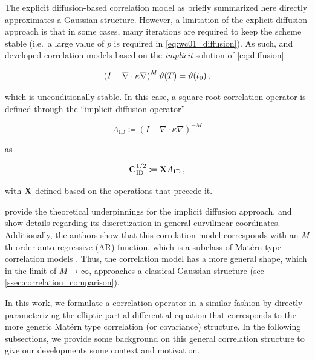 The explicit diffusion-based correlation model as briefly summarized here
directly approximates a Gaussian structure.
However, a limitation of the explicit diffusion approach is that in some cases, many
iterations are required to keep the scheme stable (i.e.\ a large value of $p$ is
required in \cref{eq:wc01_diffusion}).
As such, \citet{mirouze_representation_2010} and
\citet{carrier_background-error_2010} developed correlation models based on the
\textit{implicit} solution of \cref{eq:diffusion}:
\begin{linenomath*}\begin{equation}
    \left( I - \nabla\cdot\kappa\nabla\right)^M\vartheta(T) = \vartheta(t_0) \, ,
    \label{eq:implicit_diffusion}
\end{equation}\end{linenomath*}
which is unconditionally stable.
In this case, a square-root correlation operator is defined through the
``implicit diffusion operator''
\begin{linenomath*}\begin{equation}
A_\text{ID} \coloneqq \left(I - \nabla \cdot \kappa\nabla\right)^{-M}
\end{equation}\end{linenomath*}
as
\begin{linenomath*}\begin{equation}
    \mathbf{C}^{1/2}_\text{ID} \coloneqq \mathbf{X} A_\text{ID} \, ,
\end{equation}\end{linenomath*}
with $\mathbf{X}$ defined based on the operations that precede it.

\citet{mirouze_representation_2010} provide the theoretical underpinnings for
the implicit diffusion approach, and show details regarding its discretization
in general curvilinear coordinates.
Additionally, the authors show that this correlation model corresponds
with an $M$th order auto-regressive (AR) function,
which is a subclass of
Mat\'ern type correlation models \citep[see][for more description behind the
parameters controlling this model]{weaver_diffusion_2013}.
Thus, the correlation model has a more general shape, which in the limit of
$M\rightarrow\infty$, approaches a classical Gaussian structure (see
\cref{ssec:correlation_comparison}).

In this work, we formulate a correlation operator in a similar fashion by
directly parameterizing the
elliptic partial differential equation that corresponds to the more generic
Mat\'ern type correlation (or covariance) structure.
In the following subsections, we provide some background on this general correlation
structure to give our developments some context and motivation.

